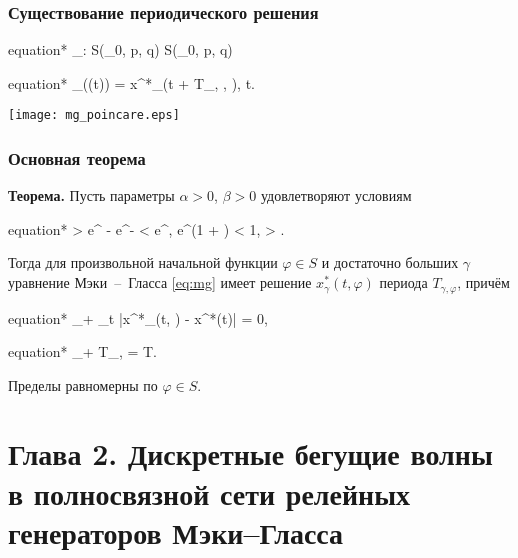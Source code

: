 \begin{frame}
	\frametitle{Существование периодического решения}
	
	\begin{empheq}[box=\myeq]{equation*}
		\Pi_{\gamma}: S(\sigma_0, p, q) \to S(\sigma_0, p, q)
	\end{empheq}
	\begin{empheq}[box=\myeq]{equation*}
		\Pi_{\gamma}(\varphi(t)) = x^*_{\gamma}(t + T_{\gamma, \varphi}, \varphi), \quad t.
	\end{empheq}
	
	\begin{center}
		\texttt{[image: mg\_poincare.eps]}
	\end{center}
\end{frame}

\begin{frame}
	\frametitle{Основная теорема}
	
	\textbf{Теорема.} Пусть параметры $\alpha > 0$, $\beta > 0$ удовлетворяют условиям
	\footnotesize
	\begin{empheq}[box=\myeq]{equation*}
		\alpha > e^{\beta} - e^{-\beta}  \alpha < \beta e^{\beta}, \quad 
		\frac{\alpha}{\beta}e^{\beta}\left(1 + \ln\frac{\beta}{\alpha}\right) < 1, \quad 
		\alpha > .
	\end{empheq}
	\normalsize
	Тогда для произвольной начальной функции $\varphi \in S$ и достаточно больших $\gamma$ уравнение Мэки~--~Гласса \eqref{eq:mg} имеет решение $x^*_\gamma(t, \varphi)$ периода $T_{\gamma, \varphi}$, причём
	
	\small
	\begin{empheq}[box=\myeq]{equation*}
		\lim\limits_{\gamma \to +\infty} \max\limits_{t } |x^*_\gamma(t, \varphi) - x^*(t)| = 0,
	\end{empheq}
	
	\begin{empheq}[box=\myeq]{equation*}
		\lim\limits_{\gamma \to +\infty} T_{\gamma, \varphi} = T.
	\end{empheq}
	\normalsize
	
	Пределы равномерны по $\varphi \in S$.
	
\end{frame}

\section{Глава 2. Дискретные бегущие волны в полносвязной сети релейных генераторов Мэки--Гласса}



